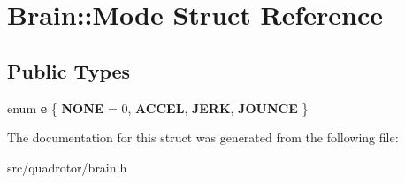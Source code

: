 \hypertarget{structBrain_1_1Mode}{\section{\-Brain\-:\-:\-Mode \-Struct \-Reference}
\label{structBrain_1_1Mode}
}
\subsection*{\-Public \-Types}
\begin{DoxyCompactItemize}
\item 
enum {\bfseries e} \{ {\bfseries \-N\-O\-N\-E} =  0, 
{\bfseries \-A\-C\-C\-E\-L}, 
{\bfseries \-J\-E\-R\-K}, 
{\bfseries \-J\-O\-U\-N\-C\-E}
 \}
\end{DoxyCompactItemize}


\-The documentation for this struct was generated from the following file\-:\begin{DoxyCompactItemize}
\item 
src/quadrotor/brain.\-h\end{DoxyCompactItemize}
